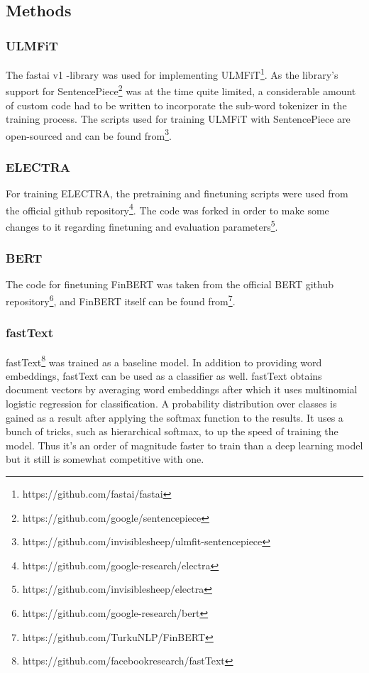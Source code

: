 \subsection{Methods}\label{Methods}
\subsubsection{ULMFiT}\label{ULMFiT}
The fastai v1 -library was used for implementing ULMFiT\footnote{https://github.com/fastai/fastai}.
As the library's support for SentencePiece\footnote{https://github.com/google/sentencepiece} was at the time quite limited, a considerable amount of custom code had to be written to incorporate the sub-word tokenizer in the training process.
The scripts used for training ULMFiT with SentencePiece are open-sourced and can be found from\footnote{https://github.com/invisiblesheep/ulmfit-sentencepiece}.

\subsubsection{ELECTRA}\label{ELECTRA}
For training ELECTRA, the pretraining and finetuning scripts were used from the official github repository\footnote{https://github.com/google-research/electra}.
The code was forked in order to make some changes to it regarding finetuning and evaluation parameters\footnote{https://github.com/invisiblesheep/electra}.

\subsubsection{BERT}\label{BERT}
The code for finetuning FinBERT was taken from the official BERT github repository\footnote{https://github.com/google-research/bert}, and FinBERT itself can be found from\footnote{https://github.com/TurkuNLP/FinBERT}.

\subsubsection{fastText}\label{fastText}
fastText\footnote{https://github.com/facebookresearch/fastText} was trained as a baseline model.
In addition to providing word embeddings, fastText can be used as a classifier as well.
fastText obtains document vectors by averaging word embeddings after which it uses multinomial logistic regression for classification.
A probability distribution over classes is gained as a result after applying the softmax function to the results.
It uses a bunch of tricks, such as hierarchical softmax, to up the speed of training the model.
Thus it's an order of magnitude faster to train than a deep learning model but it still is somewhat competitive with one.

